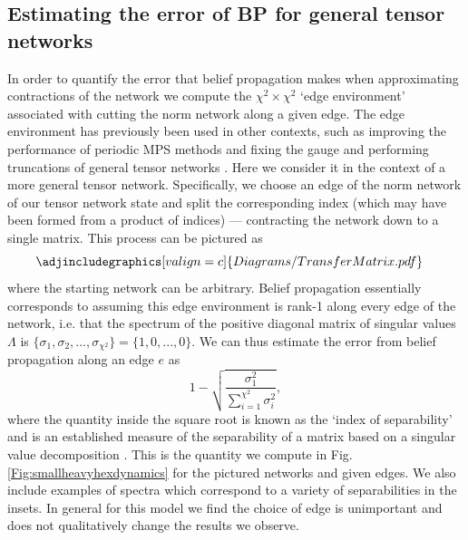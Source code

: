 \documentclass[%
 superscriptaddress,
 amsmath,amssymb,
 prx, nofootinbib,
]{revtex4-2}
\begin{document}
\subsection*{Estimating the error of BP for general tensor networks}
\label{Subsec:BPErrorEstimate}
In order to quantify the error that belief propagation makes when approximating contractions of the network we compute the $\chi^{2} \times \chi^{2}$ `edge environment' associated with cutting the norm network along a given edge. The edge environment has previously been used in other contexts, such as improving the performance of periodic MPS methods \cite{Pippan2010} and fixing the gauge and performing truncations of general tensor networks \cite{Evenbly2018}. Here we consider it in the context of a more general tensor network. Specifically, we choose an edge of the norm network of our tensor network state and split the corresponding index (which may have been formed from a product of indices) --- contracting the network down to a single matrix. This process can be pictured as 
\begin{equation}
    \adjincludegraphics[valign=c]{Diagrams/TransferMatrix.pdf} \quad
    \label{Eq:EdgeEnvironment}
\end{equation}
where the starting network can be arbitrary. Belief propagation essentially corresponds to assuming this edge environment is rank-1 along every edge of the network, i.e. that the spectrum of the positive diagonal matrix of singular values $\Lambda$ is $\{\sigma_{1}, \sigma_{2}, ..., \sigma_{\chi^{2}}\} = \{1, 0, ..., 0\}$. We can thus estimate the error from belief propagation along an edge $e$ as
\begin{equation}
    1 - \sqrt{\frac{\sigma^{2}_{1}}{\sum_{i=1}^{\chi^{2}}\sigma^{2}_{i}}},
    \label{Eq:BPErrorEstimate}
\end{equation}
where the quantity inside the square root is known as the `index of separability' and is an established measure of the separability of a matrix based on a singular value decomposition \cite{Shihab2001}. 
This is the quantity we compute in Fig. \ref{Fig:smallheavyhexdynamics} for the pictured networks and given edges. We also include examples of spectra which correspond to a variety of separabilities in the insets.
In general for this model we find the choice of edge is unimportant and does not qualitatively change the results we observe.
\end{document}
